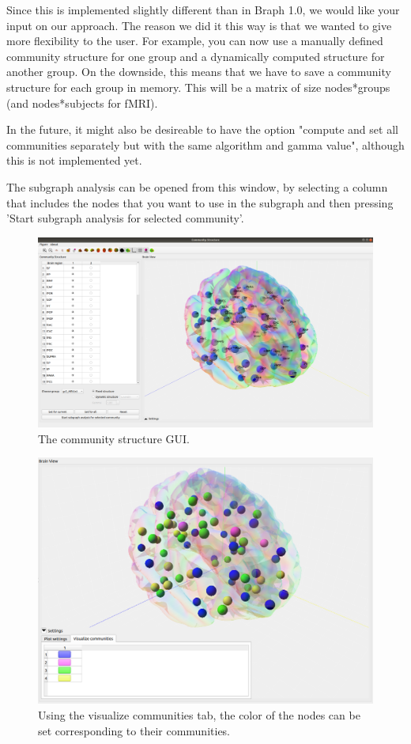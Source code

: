 \documentclass{article}
\begin{document}
Since this is implemented slightly different than in Braph 1.0, we would like your input on our approach. The reason we did it this way is that we wanted to give more flexibility to the user. For example, you can now use a manually defined community structure for one group and a dynamically computed structure for another group. On the downside, this means that we have to save a community structure for each group in memory. This will be a matrix of size nodes*groups (and nodes*subjects for fMRI).

In the future, it might also be desireable to have the option "compute and set all communities separately but with the same algorithm and gamma value", although this is not implemented yet.

The subgraph analysis can be opened from this window, by selecting a column that includes the nodes that you want to use in the subgraph and then pressing 'Start subgraph analysis for selected community'.

\begin{figure}[H]
    \centering
    \includegraphics[width=0.9\linewidth]{community_structure.png}
    \caption{The community structure GUI.}
    \label{fig:community}
\end{figure}

\begin{figure}[H]
    \centering
    \includegraphics[width=0.8\linewidth]{visualize_communities.png}
    \caption{Using the visualize communities tab, the color of the nodes can be set corresponding to their communities.}
    \label{fig:vis_com}
\end{figure}
\end{document}
